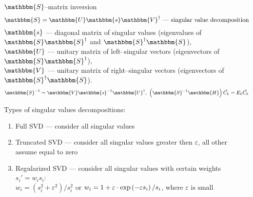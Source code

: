 \begin{frame}{}
\begin{block}{$\mathbbm{S}$--matrix inversion}
$$\mathbbm{S} = \mathbbm{U}\mathbbm{s}\mathbbm{V}^{\dagger}\text{ --- singular value decomposition}$$
$\mathbbm{s}$ --- diagonal matrix of singular values (eigenvalues of $\mathbbm{S}\mathbbm{S}^{\dagger}$ and $\mathbbm{S}^{\dagger}\mathbbm{S}$), \\
$\mathbbm{U}$ --- unitary matrix of left--singular vectors (eigenvectors of $\mathbbm{S}\mathbbm{S}^{\dagger}$), \\
$\mathbbm{V}$ --- unitary matrix of right--singular vectors (eigenvectors of $\mathbbm{S}^{\dagger}\mathbbm{S}$).
$$\mathbbm{S}^{-1} = \mathbbm{V}\mathbbm{s}^{-1}\mathbbm{U}^{\dagger},\ \left(\mathbbm{S}^{-1}\mathbbm{H}\right)\vec{C}_k=E_k\vec{C}_k$$
\end{block}
\begin{block}{Types of singular values decompositions:}
\begin{enumerate}
\item Full SVD --- consider all singular values
\item Truncated SVD --- consider all singular values greater then $\varepsilon$,
			all other assume equal to zero
\item Regularized SVD --- consider all singular values with certain weights $s_i'=w_is_i$:\\
$w_i = (s_i^2+\varepsilon^2)/s_i^2$ or $w_i = 1 + \varepsilon\cdot\text{exp}\left(-\varepsilon s_i\right)/s_i$, where $\varepsilon\text{ is small}$
\end{enumerate}
\end{block}
\end{frame}

